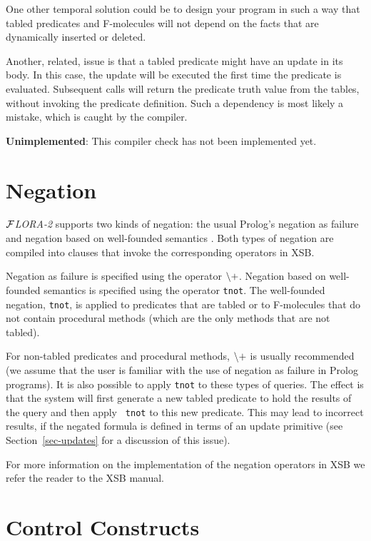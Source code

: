 \documentclass[11pt]{article}
\newcommand{\FLORA}{{\mbox{${\cal F}${\small\it LORA}\rm\emph{-2}}}\xspace}
\newcommand{\NAF}{{$\tt\backslash +$}\xspace}
\begin{document}
One other temporal solution could be to design your program in such a way
that tabled predicates and F-molecules will not depend on the facts that
are dynamically inserted or deleted.

Another, related, issue is that a tabled predicate might have an update in
its body. In this case, the update will be executed the first time the
predicate is evaluated. Subsequent calls will return the predicate truth
value from the tables, without invoking the predicate definition.
Such a dependency is most likely a mistake, which is caught by the
compiler.

{\bf Unimplemented}: This compiler check has not been implemented yet.


\section{Negation} \label{sec:negation}


\FLORA supports two kinds of negation: the usual Prolog's
negation as failure \cite{Cla78} and negation based on well-founded
semantics \cite{gelder-alternating-89,gelder-ross-schlipf-91}. Both types
of negation are compiled into clauses that invoke the corresponding
operators in XSB.

Negation as failure is specified using the operator \NAF.  Negation based
on well-founded semantics is specified using the operator {\tt tnot}. The
well-founded negation, {\tt tnot}, is applied to predicates that are tabled
or to F-molecules that do not contain procedural methods (which are the
only methods that are not tabled).

For non-tabled predicates and procedural methods, \NAF is usually
recommended (we assume that the user is familiar with the use of negation
as failure in Prolog programs).  It is also possible to apply {\tt tnot} to
these types of queries.  The effect is that the system will first generate
a new tabled predicate to hold the results of the query and then apply {\tt
  tnot} to this new predicate. This may lead to incorrect results,
if the negated formula is defined in terms of an update
primitive (see Section~\ref{sec-updates} for a discussion of this issue).

For more information on the implementation of the negation operators in XSB
we refer the reader to the XSB manual.



\section{Control Constructs}
\end{document}
